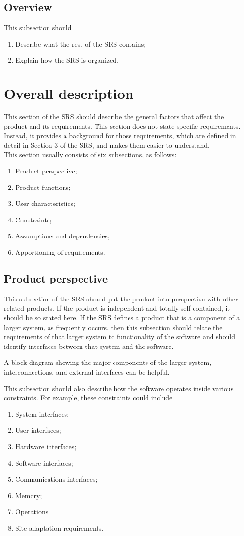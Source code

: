 \documentclass{scrreprt}
\begin{document}
\section{Overview}
This subsection should
\begin{enumerate}
	\item Describe what the rest of the SRS contains;
	\item Explain how the SRS is organized.
\end{enumerate}

\chapter{Overall description}
This section of the SRS should describe the general factors that affect the
product and its requirements. This section does not state specific requirements.
Instead, it provides a background for those requirements, which are defined in
detail in Section 3 of the SRS, and makes them easier to understand.\\
This section usually consists of six subsections, as follows:
\begin{enumerate}
	\item Product perspective;
	\item Product functions;
	\item User characteristics;
	\item Constraints;
	\item Assumptions and dependencies;
	\item Apportioning of requirements.
\end{enumerate}

\section{Product perspective}
This subsection of the SRS should put the product into perspective with other
related products. If the product is independent and totally self-contained, it
should be so stated here. If the SRS defines a product that is a component of a
larger system, as frequently occurs, then this subsection should relate the
requirements of that larger system to functionality of the software and should
identify interfaces between that system and the software.

A block diagram showing the major components of the larger system,
interconnections, and external interfaces can be helpful.

This subsection should also describe how the software operates inside various
constraints. For example, these constraints could include
\begin{enumerate}
	\item System interfaces;
	\item User interfaces;
	\item Hardware interfaces;
	\item Software interfaces;
	\item Communications interfaces;
	\item Memory;
	\item Operations;
	\item Site adaptation requirements.
\end{enumerate}
\end{document}
